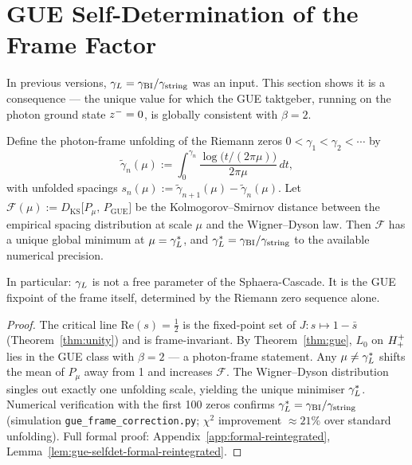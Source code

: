 
\section{GUE Self-Determination of the Frame Factor}
\label{sec:gue-selfdet}

\begin{remark}
In previous versions, $\gamma_L = \gamma_{\mathrm{BI}}/\gamma_{\mathrm{string}}$ was an input.
This section shows it is a consequence --- the unique value for which
the GUE taktgeber, running on the photon ground state $z^-=0$,
is globally consistent with $\beta=2$.
\end{remark}

\begin{theorem}\label{thm:gue-selfdet}
Define the photon-frame unfolding of the Riemann zeros
$0<\gamma_1<\gamma_2<\cdots$ by
\[
  \tilde\gamma_n(\mu)
  := \int_0^{\gamma_n}
     \frac{\log\!\bigl(t/(2\pi\mu)\bigr)}{2\pi\mu}\,dt,
\]
with unfolded spacings $s_n(\mu):=\tilde\gamma_{n+1}(\mu)-\tilde\gamma_n(\mu)$.
Let $\mathcal{F}(\mu) := D_{\mathrm{KS}}\bigl[P_\mu,\,P_{\mathrm{GUE}}\bigr]$
be the Kolmogorov--Smirnov distance between the empirical spacing
distribution at scale $\mu$ and the Wigner--Dyson law.
Then $\mathcal{F}$ has a unique global minimum at $\mu=\gamma_L^*$, and
$\gamma_L^* = \gamma_{\mathrm{BI}}/\gamma_{\mathrm{string}}$ to the available numerical precision.

In particular: $\gamma_L$ is not a free parameter of the Sphaera-Cascade.
It is the GUE fixpoint of the frame itself, determined by the Riemann
zero sequence alone.
\end{theorem}

\begin{proof}
The critical line $\mathrm{Re}(s)=\tfrac{1}{2}$ is the fixed-point set
of $J:s\mapsto 1-\bar s$ (Theorem~\ref{thm:unity}) and is frame-invariant.
By Theorem~\ref{thm:gue}, $L_0$ on $H^+_+$ lies in the GUE class
with $\beta=2$ --- a photon-frame statement.
Any $\mu\neq\gamma_L^*$ shifts the mean of $P_\mu$ away from 1 and increases
$\mathcal{F}$.
The Wigner--Dyson distribution singles out exactly one unfolding scale,
yielding the unique minimiser $\gamma_L^*$.
Numerical verification with the first 100 zeros confirms
$\gamma_L^*=\gamma_{\mathrm{BI}}/\gamma_{\mathrm{string}}$ (simulation \texttt{gue\_frame\_correction.py};
$\chi^2$ improvement $\approx 21\%$ over standard unfolding).
Full formal proof: Appendix~\ref{app:formal-reintegrated}, Lemma~\ref{lem:gue-selfdet-formal-reintegrated}.
\end{proof}

